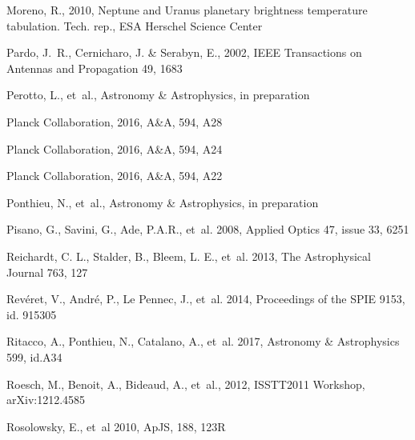 \begin{thebibliography}{99}
Moreno, R., 2010, 
Neptune and Uranus planetary brightness temperature tabulation. Tech. rep., ESA Herschel Science Center

Pardo, J.~R., Cernicharo, J. \& Serabyn, E., 2002, 
IEEE Transactions on Antennas and Propagation 49, 1683
    
Perotto, L., {et~al.}, 
Astronomy \& Astrophysics, in preparation


Planck Collaboration, 2016, A\&A, 594, A28


Planck Collaboration, 2016, A\&A, 594, A24


Planck Collaboration, 2016, A\&A, 594, A22

Ponthieu, N., {et~al.}, 
Astronomy \& Astrophysics, in preparation

Pisano, G., Savini, G., Ade, P.A.R., {et~al.} 2008, 
Applied Optics 47, issue 33, 6251

Reichardt, C. L., Stalder, B., Bleem, L. E., {et~al.} 2013, 
The Astrophysical Journal 763, 127

Rev\'eret, V., Andr\'e, P., Le Pennec, J., {et~al.} 2014, 
Proceedings of the SPIE 9153, id. 915305

Ritacco, A., Ponthieu, N., Catalano, A., {et~al.} 2017, 
Astronomy \& Astrophysics 599, id.A34

Roesch, M., Benoit, A., Bideaud, A., {et~al.}, 2012, 
ISSTT2011 Workshop, arXiv:1212.4585

Rosolowsky, E., {et~al} 2010, ApJS, 188, 123R


\end{thebibliography}
